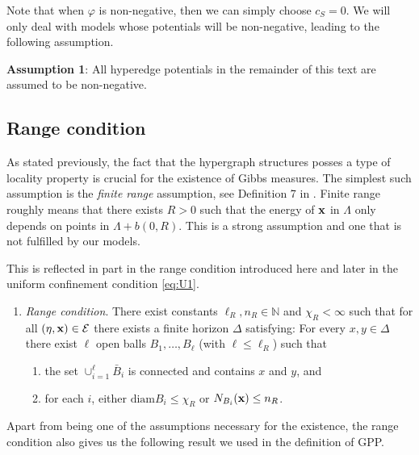 Note that when $\varphi$ is non-negative, then we can simply choose $c_S = 0$. We will only deal with models whose potentials will be non-negative, leading to the following assumption.\newline


\noindent \textbf{Assumption 1}: All hyperedge potentials in the remainder of this text are assumed to be non-negative.

\subsection{Range condition} \label{sec:range}
As stated previously, the fact that the hypergraph structures posses a type of locality property is crucial for the existence of Gibbs measures. The simplest such assumption is the \textit{finite range} assumption, see Definition 7 in \cite{Dereudre2017}. Finite range roughly means that there exists $R>0$ such that the energy of ${\mathbf{x}}$ in $\Lambda$ only depends on points in $\Lambda + b(0,R)$. This is a strong assumption and one that is not fulfilled by our models. 

This is reflected in part in the range condition introduced here and later in the uniform confinement condition \eqref{eq:U1}.

\begin{enumerate}[\textbf{(R)}]\label{(R)}
	\item \textit{Range condition}. There exist constants $\ell_R,n_R \in \mathbb N$ and $\chi_R < \infty$ such that for all $(\eta,{\mathbf{x}}) \in \mathcal E$ there exists a finite horizon $\Delta$ satisfying: For every $x,y \in \Delta$ there exist $\ell$ open balls $B_1, \dots, B_\ell$ (with $\ell \leq \ell_R$) such that
	\begin{enumerate}[-]
		\item the set $\cup^\ell_{i=1} \bar B_i$ is connected and contains $x$ and $y$, and 
		\item for each $i$, either $\text{diam} B_i \leq \chi_R$ or $N_{B_i}({\mathbf{x}}) \leq n_R$.
	\end{enumerate}
\end{enumerate}


Apart from being one of the assumptions necessary for the existence, the range condition also gives us the following result we used in the definition of GPP.

